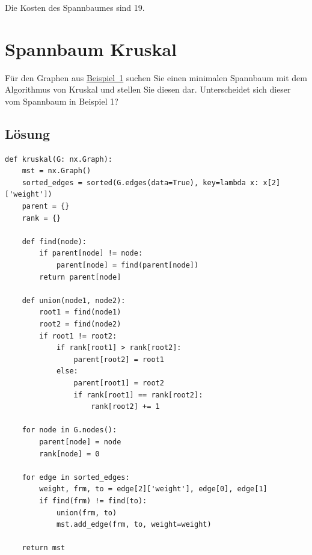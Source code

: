 \documentclass[a4paper,11pt]{report}
\begin{document}
    Die Kosten des Spannbaumes sind 19.

    \newpage

    \chapter{Spannbaum Kruskal}
    \label{ch:sbkruskal}
    Für den Graphen aus \hyperref[fig:a01_graph]{Beispiel~1} suchen Sie einen minimalen Spannbaum mit dem Algorithmus von
    Kruskal und stellen Sie diesen dar. Unterscheidet sich dieser vom Spannbaum in Beispiel 1?

    \section{Lösung}

    \begin{verbatim}
def kruskal(G: nx.Graph):
    mst = nx.Graph()
    sorted_edges = sorted(G.edges(data=True), key=lambda x: x[2]['weight'])
    parent = {}
    rank = {}

    def find(node):
        if parent[node] != node:
            parent[node] = find(parent[node])
        return parent[node]

    def union(node1, node2):
        root1 = find(node1)
        root2 = find(node2)
        if root1 != root2:
            if rank[root1] > rank[root2]:
                parent[root2] = root1
            else:
                parent[root1] = root2
                if rank[root1] == rank[root2]:
                    rank[root2] += 1

    for node in G.nodes():
        parent[node] = node
        rank[node] = 0

    for edge in sorted_edges:
        weight, frm, to = edge[2]['weight'], edge[0], edge[1]
        if find(frm) != find(to):
            union(frm, to)
            mst.add_edge(frm, to, weight=weight)

    return mst
    \end{verbatim}
\end{document}
